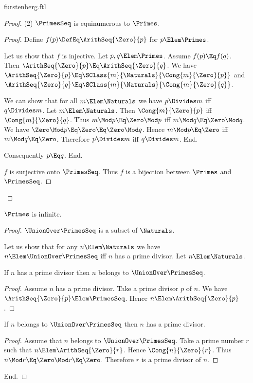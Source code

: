 \documentclass{stex}
\begin{document}
\begin{smodule}{furstenberg.ftl}
\begin{forthel}
\begin{proof}
    (2) $\PrimesSeq$ is equinumerous to $\Primes$.
    \begin{proof}
      Define $f(p) \DefEq \ArithSeq{\Zero}{p}$ for $p \Elem \Primes$.

      Let us show that $f$ is injective.
        Let $p, q \Elem \Primes$.
        Assume $f(p) \Eq f(q)$.
        Then $\ArithSeq{\Zero}{p} \Eq \ArithSeq{\Zero}{q}$.
        We have $\ArithSeq{\Zero}{p} \Eq \SClass{m}{\Naturals}{\Cong{m}{\Zero}{p}}$ and
        $\ArithSeq{\Zero}{q} \Eq\linebreak \SClass{m}{\Naturals}{\Cong{m}{\Zero}{q}}$.

        We can show that for all $m \Elem \Naturals$ we have $p \Divides m$ iff $q \Divides m$.
          Let $m \Elem \Naturals$.
          Then $\Cong{m}{\Zero}{p}$ iff $\Cong{m}{\Zero}{q}$.
          Thus $m \Mod p \Eq \Zero \Mod p$ iff $m \Mod q \Eq\linebreak \Zero \Mod q$.
          We have $\Zero \Mod p \Eq \Zero \Eq \Zero \Mod q$.
          Hence $m \Mod p \Eq \Zero$ iff $m \Mod q \Eq\linebreak \Zero$.
          Therefore $p \Divides m$ iff $q \Divides m$.
        End.

        Consequently $p \Eq q$.
      End.

      $f$ is surjective onto $\PrimesSeq$.
      Thus $f$ is a bijection between $\Primes$ and $\PrimesSeq$.
    \end{proof}
  \end{proof}

  \begin{theorem}[title=Furstenberg,name=Furstenberg]
    $\Primes$ is infinite.
  \end{theorem}
  \begin{proof}
    $\UnionOver \PrimesSeq$ is a subset of $\Naturals$.

    Let us show that for any $n \Elem \Naturals$ we have $n \Elem \UnionOver \PrimesSeq$ iff $n$
    has a prime divisor.
      Let $n \Elem \Naturals$.

      If $n$ has a prime divisor then $n$ belongs to $\UnionOver \PrimesSeq$.
      \begin{proof}
        Assume $n$ has a prime divisor.
        Take a prime divisor $p$ of $n$.
        We have $\ArithSeq{\Zero}{p} \Elem \PrimesSeq$.
        Hence $n \Elem \ArithSeq{\Zero}{p}$.
      \end{proof}

      If $n$ belongs to $\UnionOver \PrimesSeq$ then $n$ has a prime divisor.
      \begin{proof}
        Assume that $n$ belongs to $\UnionOver \PrimesSeq$.
        Take a prime number $r$ such that $n \Elem \ArithSeq{\Zero}{r}$.
        Hence $\Cong{n}{\Zero}{r}$.
        Thus $n \Mod r \Eq \Zero \Mod r \Eq \Zero$.
        Therefore $r$ is a prime divisor of $n$.
      \end{proof}
    End.


\end{proof}
\end{forthel}
\end{smodule}
\end{document}
